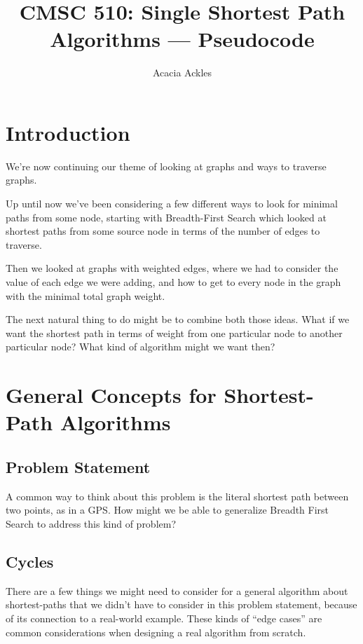 \documentclass[]{article}
\title{CMSC 510: Single Shortest Path Algorithms --- Pseudocode}
\author{Acacia Ackles}
\begin{document}
\maketitle

\section*{Introduction}

We're now continuing our theme of looking at graphs and ways to traverse graphs. 

Up until now we've been considering a few different ways to look for minimal paths from some node, starting with Breadth-First Search which looked at shortest paths from some source node in terms of the number of edges to traverse. 

Then we looked at graphs with weighted edges, where we had to consider the value of each edge we were adding, and how to get to every node in the graph with the minimal total graph weight. 

The next natural thing to do might be to combine both those ideas. What if we want the shortest path in terms of weight from one particular node to another particular node? What kind of algorithm might we want then? 

\section*{General Concepts for Shortest-Path Algorithms}

\subsection*{Problem Statement}

A common way to think about this problem is the literal shortest path between two points, as in a GPS. How might we be able to generalize Breadth First Search to address this kind of problem? 

\subsection*{Cycles}

There are a few things we might need to consider for a general algorithm about shortest-paths that we didn't have to consider in this problem statement, because of its connection to a real-world example. These kinds of ``edge cases'' are common considerations when designing a real algorithm from scratch. 
\end{document}
